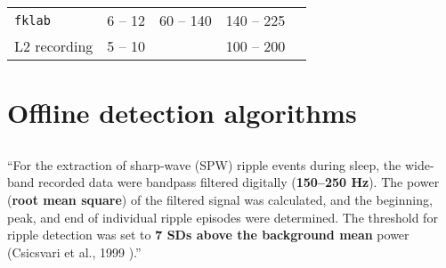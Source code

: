 \begin{table}
\begin{tabular}{@{}lllll@{}}
\midrule
\texttt{fklab}             & 6 -- 12    & 60 -- 140       & 140 -- 225  \\
L2 recording               & 5 -- 10    &                 & 100 -- 200  \\
\bottomrule
\end{tabular}
\label{tab:bands}
\end{table}





\clearpage
\section{Offline detection algorithms}
\label{apx:offline-detection-algos}



\subsection{}

\begin{quotebar}
``For the extraction of sharp-wave (SPW) ripple events during sleep, the wide-band recorded data were bandpass filtered digitally (\textbf{150–250 Hz}). The power (\textbf{root mean square}) of the filtered signal was calculated, and the beginning, peak, and end of individual ripple episodes were determined. The threshold for ripple detection was set to \textbf{7 SDs above the background mean} power (Csicsvari et al., 1999 \cite{Csicsvari1999}).'' \cite{Nadasdy1999}
\end{quotebar}


\subsection{}

